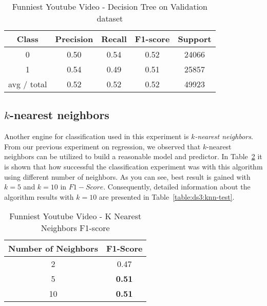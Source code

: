 \begin{table}[p]
\begin{center}
\begin{tabular}{|c|c|c|c|c|}
\hline Class & Precision & Recall & F1-score & Support \\

\hline 0 & 0.50 & 0.54 & 0.52 & 24066\\
\hline 1 & 0.54 & 0.49 & 0.51 & 25857\\
\hline avg / total & 0.52 & 0.52 & 0.52 & 49923\\
\hline
\end{tabular}

\caption{Funniest Youtube Video - Decision Tree on Validation dataset}
\label{table:db2:decisiontree-test}
\end{center}
\end{table}

\subsection{$k$-nearest neighbors}

Another engine for classification used in this experiment is {\it
$k$-nearest neighbors}. From our previous experiment on regression, we
observed that $k$-nearest neighbors can be utilized to build a reasonable model and
predictor. In Table~\ref{table:ds3:knn} it is shown that how successful the
classification experiment was with this algorithm using different number of neighbors. As you
can see, best result is gained with $k=5$ and $k=10$ in $F1-Score$.
Consequently, detailed information about the algorithm results with $k=10$ are
presented in Table~\ref{table:ds3:knn-test}.


\begin{table}[p]
\begin{center}
\begin{tabular}{|c|c|}
\hline Number of Neighbors & F1-Score \\

\hline 2 & 0.47 \\
\hline 5 & {\bf 0.51} \\
\hline 10 & {\bf 0.51} \\

\hline
\end{tabular}

\caption{Funniest Youtube Video - K Nearest Neighbors  F1-score}
\label{table:ds3:knn}
\end{center}
\end{table}

